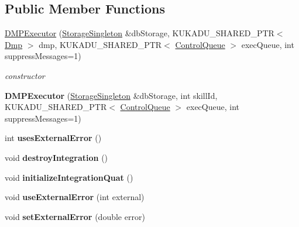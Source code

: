 \subsection*{Public Member Functions}
\begin{DoxyCompactItemize}
\item 
\hyperlink{classkukadu_1_1DMPExecutor_a82f622c76dcdd575db893d86f1a52027}{D\+M\+P\+Executor} (\hyperlink{classkukadu_1_1StorageSingleton}{Storage\+Singleton} \&db\+Storage, K\+U\+K\+A\+D\+U\+\_\+\+S\+H\+A\+R\+E\+D\+\_\+\+P\+TR$<$ \hyperlink{classkukadu_1_1Dmp}{Dmp} $>$ dmp, K\+U\+K\+A\+D\+U\+\_\+\+S\+H\+A\+R\+E\+D\+\_\+\+P\+TR$<$ \hyperlink{classkukadu_1_1ControlQueue}{Control\+Queue} $>$ exec\+Queue, int suppress\+Messages=1)
\begin{DoxyCompactList}\small\item\em constructor \end{DoxyCompactList}\item 
{\bfseries D\+M\+P\+Executor} (\hyperlink{classkukadu_1_1StorageSingleton}{Storage\+Singleton} \&db\+Storage, int skill\+Id, K\+U\+K\+A\+D\+U\+\_\+\+S\+H\+A\+R\+E\+D\+\_\+\+P\+TR$<$ \hyperlink{classkukadu_1_1ControlQueue}{Control\+Queue} $>$ exec\+Queue, int suppress\+Messages=1)\hypertarget{classkukadu_1_1DMPExecutor_afd509255c0bc7d63ca626adcb9eb6594}{}\label{classkukadu_1_1DMPExecutor_afd509255c0bc7d63ca626adcb9eb6594}

\item 
int {\bfseries uses\+External\+Error} ()\hypertarget{classkukadu_1_1DMPExecutor_a97054e488e997d275cdcc8d58554a3e6}{}\label{classkukadu_1_1DMPExecutor_a97054e488e997d275cdcc8d58554a3e6}

\item 
void {\bfseries destroy\+Integration} ()\hypertarget{classkukadu_1_1DMPExecutor_aa67aae8df58ef660f694a0c322fa251e}{}\label{classkukadu_1_1DMPExecutor_aa67aae8df58ef660f694a0c322fa251e}

\item 
void {\bfseries initialize\+Integration\+Quat} ()\hypertarget{classkukadu_1_1DMPExecutor_a30488907c4a7f95040137aaa22f7783d}{}\label{classkukadu_1_1DMPExecutor_a30488907c4a7f95040137aaa22f7783d}

\item 
void {\bfseries use\+External\+Error} (int external)\hypertarget{classkukadu_1_1DMPExecutor_af6bdcf008a271ebaf971e538ee7de962}{}\label{classkukadu_1_1DMPExecutor_af6bdcf008a271ebaf971e538ee7de962}

\item 
void {\bfseries set\+External\+Error} (double error)\hypertarget{classkukadu_1_1DMPExecutor_a0f61c96beb3e2d2d263d2de02da6afa4}{}\label{classkukadu_1_1DMPExecutor_a0f61c96beb3e2d2d263d2de02da6afa4}


\end{DoxyCompactItemize}
